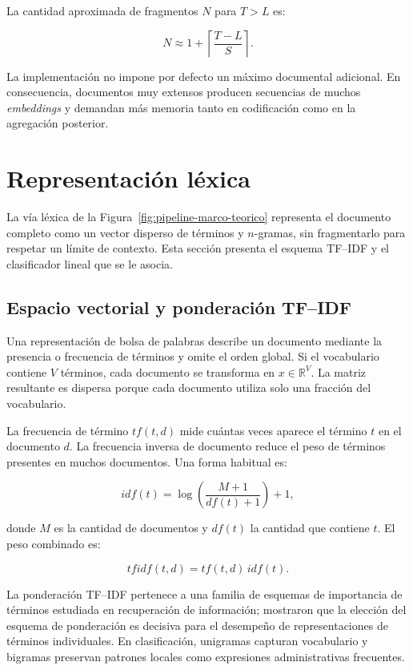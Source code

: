 La cantidad aproximada de fragmentos $N$ para $T>L$ es:

\begin{equation}
  N \approx 1 + \left\lceil\frac{T-L}{S}\right\rceil.
\end{equation}

La implementación no impone por defecto un máximo documental adicional. En consecuencia, documentos muy extensos producen secuencias de muchos \textit{embeddings} y demandan más memoria tanto en codificación como en la agregación posterior.

\section{Representación léxica}
\label{sec:representacion_lexica}

La vía léxica de la Figura~\ref{fig:pipeline-marco-teorico} representa el documento completo como un vector disperso de términos y $n$-gramas, sin fragmentarlo para respetar un límite de contexto. Esta sección presenta el esquema TF--IDF y el clasificador lineal que se le asocia.

\subsection{Espacio vectorial y ponderación TF--IDF}

Una representación de bolsa de palabras describe un documento mediante la presencia o frecuencia de términos y omite el orden global. Si el vocabulario contiene $V$ términos, cada documento se transforma en $x\in\mathbb{R}^{V}$. La matriz resultante es dispersa porque cada documento utiliza solo una fracción del vocabulario.

La frecuencia de término $tf(t,d)$ mide cuántas veces aparece el término $t$ en el documento $d$. La frecuencia inversa de documento reduce el peso de términos presentes en muchos documentos. Una forma habitual es:

\begin{equation}
  idf(t)=\log\left(\frac{M+1}{df(t)+1}\right)+1,
\end{equation}

donde $M$ es la cantidad de documentos y $df(t)$ la cantidad que contiene $t$. El peso combinado es:

\begin{equation}
  tfidf(t,d)=tf(t,d)\,idf(t).
\end{equation}

La ponderación TF--IDF pertenece a una familia de esquemas de importancia de términos estudiada en recuperación de información; \textcite{salton1988termweighting} mostraron que la elección del esquema de ponderación es decisiva para el desempeño de representaciones de términos individuales. En clasificación, unigramas capturan vocabulario y bigramas preservan patrones locales como expresiones administrativas frecuentes.

